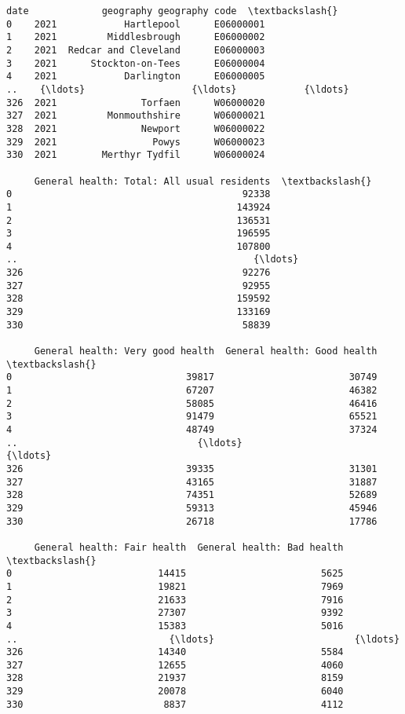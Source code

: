 \documentclass[11pt]{article}
\makeatletter
\newcommand{\boxspacing}{\kern\kvtcb@left@rule\kern\kvtcb@boxsep}
\newcommand{\prompt}[4]{
        {\ttfamily\llap{{\color{#2}[#3]:\hspace{3pt}#4}}\vspace{-\baselineskip}}
    }
\makeatother
\begin{document}
            \begin{tcolorbox}[breakable, size=fbox, boxrule=.5pt, pad at break*=1mm, opacityfill=0]
\prompt{Out}{outcolor}{9}{\boxspacing}
\begin{Verbatim}[commandchars=\\\{\}]
     date             geography geography code  \textbackslash{}
0    2021            Hartlepool      E06000001
1    2021         Middlesbrough      E06000002
2    2021  Redcar and Cleveland      E06000003
3    2021      Stockton-on-Tees      E06000004
4    2021            Darlington      E06000005
..    {\ldots}                   {\ldots}            {\ldots}
326  2021               Torfaen      W06000020
327  2021         Monmouthshire      W06000021
328  2021               Newport      W06000022
329  2021                 Powys      W06000023
330  2021        Merthyr Tydfil      W06000024

     General health: Total: All usual residents  \textbackslash{}
0                                         92338
1                                        143924
2                                        136531
3                                        196595
4                                        107800
..                                          {\ldots}
326                                       92276
327                                       92955
328                                      159592
329                                      133169
330                                       58839

     General health: Very good health  General health: Good health  \textbackslash{}
0                               39817                        30749
1                               67207                        46382
2                               58085                        46416
3                               91479                        65521
4                               48749                        37324
..                                {\ldots}                          {\ldots}
326                             39335                        31301
327                             43165                        31887
328                             74351                        52689
329                             59313                        45946
330                             26718                        17786

     General health: Fair health  General health: Bad health  \textbackslash{}
0                          14415                        5625
1                          19821                        7969
2                          21633                        7916
3                          27307                        9392
4                          15383                        5016
..                           {\ldots}                         {\ldots}
326                        14340                        5584
327                        12655                        4060
328                        21937                        8159
329                        20078                        6040
330                         8837                        4112


\end{Verbatim}
\end{tcolorbox}
\end{document}
